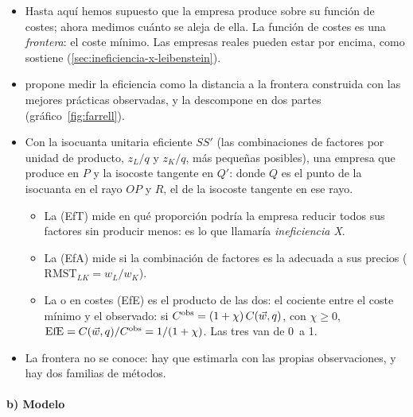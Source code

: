 \documentclass[11pt]{article}
\begin{document}
\begin{itemize}
\item Hasta aquí hemos supuesto que la empresa produce sobre su función de costes; ahora medimos cuánto se aleja de ella. La función de costes es una \emph{frontera}: el coste mínimo. Las empresas reales pueden estar por encima, como sostiene  (\ref{sec:ineficiencia-x-leibenstein}).
\item \textcite{Farrell1957Measurement} propone medir la eficiencia como la distancia a la frontera construida con las mejores prácticas observadas, y la descompone en dos partes (gráfico~\ref{fig:farrell}).
\item Con la isocuanta unitaria eficiente $SS'$ (las combinaciones de factores por unidad de producto, $z_L/q$ y $z_K/q$, más pequeñas posibles), una empresa que produce en $P$ y la isocoste tangente en $Q'$:
  donde $Q$ es el punto de la isocuanta en el rayo $OP$ y $R$, el de la isocoste tangente en ese rayo.
  \begin{itemize}
  \item La  (EfT) mide en qué proporción podría la empresa reducir todos sus factores sin producir menos: es lo que  llamaría \emph{ineficiencia X}.
  \item La  (EfA) mide si la combinación de factores es la adecuada a sus precios ($\mathrm{RMST}_{LK}=w_L/w_K$).
  \item La  o en costes (EfE) es el producto de las dos: el cociente entre el coste mínimo y el observado: si $C^{\mathrm{obs}}=(1+\chi)\,C(\vec{w},q)$, con $\chi\geq 0$, $\mathrm{EfE}=C(\vec{w},q)/C^{\mathrm{obs}}=1/(1+\chi)$. Las tres van de 0~a 1.
  \end{itemize}
\item La frontera no se conoce: hay que estimarla con las propias observaciones, y hay dos familias de métodos.
\end{itemize}


\paragraph{b) Modelo}
\end{document}
